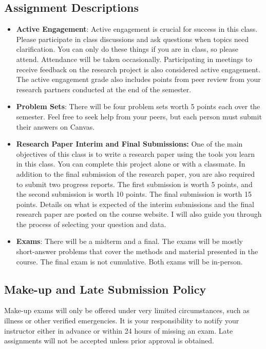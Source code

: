 \documentclass{./../Latex/syllabus}
\begin{document}
\subsection*{Assignment Descriptions}

\begin{itemize}
\item \textbf{Active Engagement}: Active engagement is crucial for success in this class. Please participate in class discussions and ask questions when topics need clarification. You can only do these things if you are in class, so please attend. Attendance will be taken occasionally. Participating in meetings to receive feedback on the research project is also considered active engagement. The active engagement grade also includes points from peer review from your research partners conducted at the end of the semester. \\
\item \textbf{Problem Sets}: There will be four problem sets worth 5 points each over the semester. Feel free to seek help from your peers, but each person must submit their answers on Canvas. \\
\item \textbf{Research Paper Interim and Final Submissions:}
One of the main objectives of this class is to write a research paper using the tools you learn in this class. You can complete this project alone or with a classmate. In addition to the final submission of the research paper, you are also required to submit two progress reports. The first submission is worth 5 points, and the second submission is worth 10 points. The final submission is worth 15 points. Details on what is expected of the interim submissions and the final research paper are posted on the course website. I will also guide you through the process of selecting your question and data. \\
\item \textbf{Exams}: There will be a midterm and a final. The exams will be mostly short-answer problems that cover the methods and material presented in the course. The final exam is not cumulative. Both exams will be in-person.
\end{itemize}

\subsection*{Make-up and Late Submission Policy}

Make-up exams will only be offered under very limited circumstances, such as illness or other verified emergencies. It is your responsibility to notify your instructor either in advance or within 24 hours of missing an exam. Late assignments will not be accepted unless prior approval is obtained. 
\end{document}
